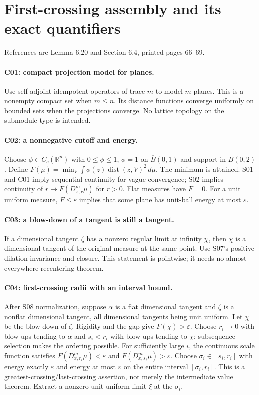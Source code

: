 \section{First-crossing assembly and its exact quantifiers}
References are Lemma 6.20 and Section 6.4, printed pages 66--69.

\paragraph{C01: compact projection model for planes.}
Use self-adjoint idempotent operators of trace $m$ to model $m$-planes.
This is a nonempty compact set when $m\leq n$.
Its distance functions converge uniformly on bounded sets when the projections
converge. No lattice topology on the submodule type is intended.

\paragraph{C02: a nonnegative cutoff and energy.}
Choose $\phi\in C_c(\mathbb R^n)$ with $0\leq\phi\leq1$,
$\phi=1$ on $\overline B(0,1)$ and support in $B(0,2)$.
Define $F(\mu)=\min_V\int\phi(z)\operatorname{dist}(z,V)^2\,d\mu$.
The minimum is attained. S01 and C01 imply sequential continuity for vague
convergence; S02 implies continuity of $r\mapsto F(D^m_{x,r}\mu)$ for $r>0$.
Flat measures have $F=0$. For a unit uniform measure, $F\leq\varepsilon$
implies that some plane has unit-ball energy at most $\varepsilon$.

\paragraph{C03: a blow-down of a tangent is still a tangent.}
If a dimensional tangent $\zeta$ has a nonzero regular limit at infinity $\chi$,
then $\chi$ is a dimensional tangent of the original measure at the same point.
Use S07's positive dilation invariance and closure. This statement is pointwise;
it needs no almost-everywhere recentering theorem.

\paragraph{C04: first-crossing radii with an interval bound.}
After S08 normalization, suppose $\alpha$ is a flat dimensional tangent and
$\zeta$ is a nonflat dimensional tangent, all dimensional tangents being unit
uniform. Let $\chi$ be the blow-down of $\zeta$. Rigidity and the gap give
$F(\chi)>\varepsilon$. Choose $r_i\to0$ with blow-ups tending to $\alpha$
and $s_i<r_i$ with blow-ups tending to $\chi$; subsequence selection makes
the ordering possible. For sufficiently large $i$, the continuous scale
function satisfies $F(D_{x,r_i}^m\mu)<\varepsilon$ and
$F(D_{x,s_i}^m\mu)>\varepsilon$.
Choose $\sigma_i\in[s_i,r_i]$ with energy exactly $\varepsilon$ and energy
at most $\varepsilon$ on the entire interval $[\sigma_i,r_i]$.
This is a greatest-crossing/last-crossing assertion, not merely the intermediate
value theorem. Extract a nonzero unit uniform limit $\xi$ at the $\sigma_i$.

